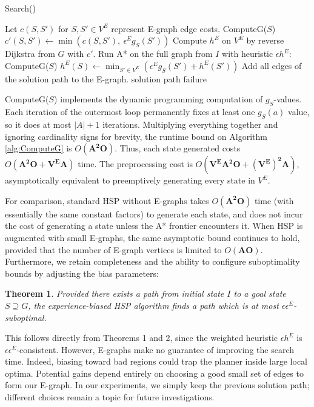 \documentclass[letterpaper]{article}
\newtheorem{thm}{Theorem}
\begin{document}
\begin{algorithm}
\caption{Search()}
\label{alg:Search}
\begin{algorithmic}
\STATE Let $c(S,S')$ for $S,S'\in V^E$ represent E-graph edge costs.
\STATE ComputeG($S$)
\STATE $c'(S,S') \leftarrow \min\left(c(S,S'),~\epsilon^E g_S(S')\right)$
\ENDFOR
\ENDFOR
\STATE Compute $h^E$ on $V^E$ by reverse Dijkstra from $G$ with $c'$.
\STATE Run A* on the full graph from $I$ with heuristic $\epsilon h^E$:
\STATE ComputeG($S$)
\STATE $h^E(S) \leftarrow \min_{S'\in V^E} \left( \epsilon^E g_S(S') + h^E(S') \right)$
\ENDFOR
{}
\STATE Add all edges of the solution path to the E-graph.
\RETURN solution path
\ELSE
\RETURN failure
\ENDIF
\end{algorithmic}
\end{algorithm}

ComputeG($S$) implements the dynamic programming computation of $g_S$-values.
Each iteration of the outermost loop permanently fixes at least one $g_S(a)$ value, so it does at most $|A|+1$ iterations.
Multiplying everything together and ignoring cardinality signs for brevity, the runtime bound on Algorithm \ref{alg:ComputeG} is $O(\mathbf{A^2O})$.
Thus, each state generated costs $O(\mathbf{A^2O + V^EA})$ time.
The preprocessing cost is $O(\mathbf{V^EA^2O + (V^E)^2A})$, asymptotically equivalent to preemptively generating every state in $V^E$.

For comparison, standard HSP without E-graphs takes $O(\mathbf{A^2O})$ time (with essentially the same constant factors) to generate each state, and does not incur the cost of generating a state unless the A* frontier encounters it.
When HSP is augmented with small E-graphs, the same asymptotic bound continues to hold, provided that the number of E-graph vertices is limited to $O(\mathbf{AO})$. Furthermore, we retain completeness and the ability to configure suboptimality bounds by adjusting the bias parameters:

\begin{thm}
Provided there exists a path from initial state $I$ to a goal state $S\supseteq G$, the experience-biased HSP algorithm finds a path which is at most $\epsilon\epsilon^E$-suboptimal.
\end{thm}

This follows directly from Theorems 1 and 2, since the weighted heuristic $\epsilon h^E$ is $\epsilon \epsilon^E$-consistent.
However, E-graphs make no guarantee of improving the search time. Indeed, biasing toward bad regions could trap the planner inside large local optima.
Potential gains depend entirely on choosing a good small set of edges to form our E-graph.
In our experiments, we simply keep the previous solution path; different choices remain a topic for future investigations.
\end{document}
